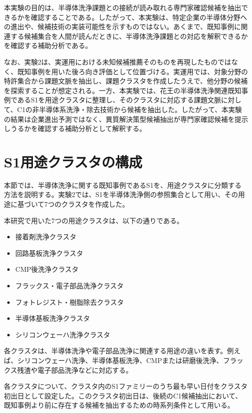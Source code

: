 本実験の目的は、半導体洗浄課題との接続が読み取れる専門家確認候補を抽出できるかを確認することである。したがって、本実験は、特定企業の半導体分野への進出や、候補技術の実装可能性を示すものではない。あくまで、既知事例に関連する候補集合を人間が読んだときに、半導体洗浄課題との対応を解釈できるかを確認する補助分析である。

なお、実験2は、実運用における未知候補推薦そのものを再現したものではなく、既知事例を用いた後ろ向き評価として位置づける。実運用では、対象分野の特許集合から課題文脈を抽出し、課題クラスタを作成したうえで、他分野の候補を探索することが想定される。一方、本実験では、花王の半導体洗浄関連既知事例であるS1を用途クラスタに整理し、そのクラスタに対応する課題文脈に対して、C1の非半導体系洗浄・除去技術から候補を抽出した。したがって、本実験の結果は企業進出予測ではなく、異質解決策型候補抽出が専門家確認候補を提示しうるかを確認する補助分析として解釈する。

\section{S1用途クラスタの構成}

本節では、半導体洗浄に関する既知事例であるS1を、用途クラスタに分類する方法を説明する。実験2では、S1を半導体洗浄側の参照集合として用い、その用途に基づいて7つのクラスタを作成した。

本研究で用いた7つの用途クラスタは、以下の通りである。

\begin{itemize}
\item 接着剤洗浄クラスタ
\item 回路基板洗浄クラスタ
\item CMP後洗浄クラスタ
\item フラックス・電子部品洗浄クラスタ
\item フォトレジスト・樹脂除去クラスタ
\item 半導体基板洗浄クラスタ
\item シリコンウェーハ洗浄クラスタ
\end{itemize}

各クラスタは、半導体洗浄や電子部品洗浄に関連する用途の違いを表す。例えば、シリコンウェーハ洗浄、半導体基板洗浄、CMPまたは研磨後洗浄、フラックス残渣や電子部品洗浄などに対応する。

各クラスタについて、クラスタ内のS1ファミリーのうち最も早い日付をクラスタ初出日として設定した。このクラスタ初出日は、後続のC1候補抽出において、既知事例より前に存在する候補を抽出するための時系列条件として用いる。

